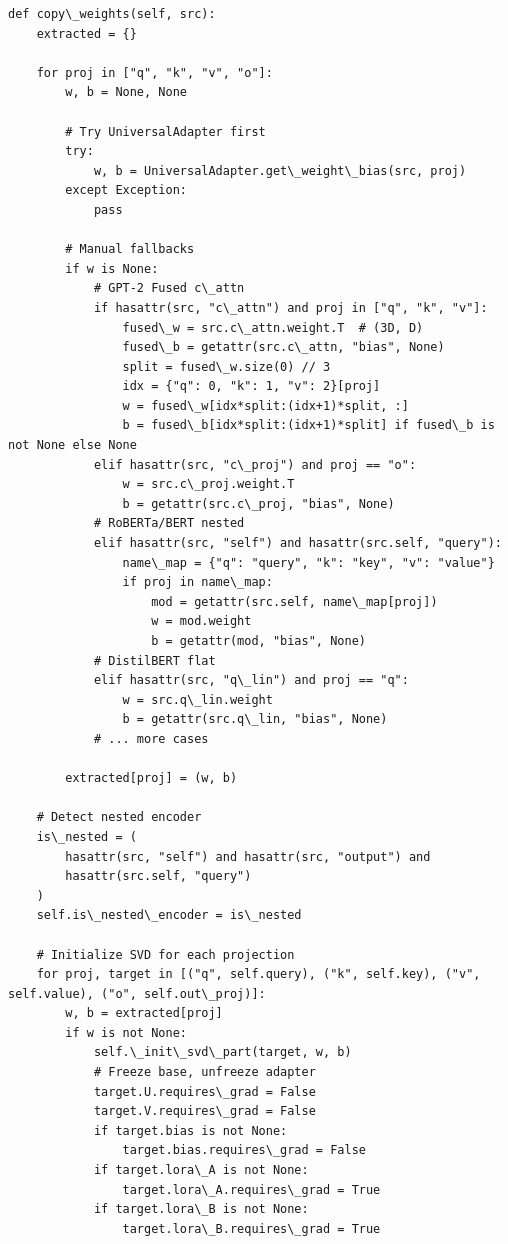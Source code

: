 \begin{lstlisting}
def copy\_weights(self, src):
    extracted = {}
    
    for proj in ["q", "k", "v", "o"]:
        w, b = None, None
        
        # Try UniversalAdapter first
        try:
            w, b = UniversalAdapter.get\_weight\_bias(src, proj)
        except Exception:
            pass
        
        # Manual fallbacks
        if w is None:
            # GPT-2 Fused c\_attn
            if hasattr(src, "c\_attn") and proj in ["q", "k", "v"]:
                fused\_w = src.c\_attn.weight.T  # (3D, D)
                fused\_b = getattr(src.c\_attn, "bias", None)
                split = fused\_w.size(0) // 3
                idx = {"q": 0, "k": 1, "v": 2}[proj]
                w = fused\_w[idx*split:(idx+1)*split, :]
                b = fused\_b[idx*split:(idx+1)*split] if fused\_b is not None else None
            elif hasattr(src, "c\_proj") and proj == "o":
                w = src.c\_proj.weight.T
                b = getattr(src.c\_proj, "bias", None)
            # RoBERTa/BERT nested
            elif hasattr(src, "self") and hasattr(src.self, "query"):
                name\_map = {"q": "query", "k": "key", "v": "value"}
                if proj in name\_map:
                    mod = getattr(src.self, name\_map[proj])
                    w = mod.weight
                    b = getattr(mod, "bias", None)
            # DistilBERT flat
            elif hasattr(src, "q\_lin") and proj == "q":
                w = src.q\_lin.weight
                b = getattr(src.q\_lin, "bias", None)
            # ... more cases
        
        extracted[proj] = (w, b)
    
    # Detect nested encoder
    is\_nested = (
        hasattr(src, "self") and hasattr(src, "output") and
        hasattr(src.self, "query")
    )
    self.is\_nested\_encoder = is\_nested
    
    # Initialize SVD for each projection
    for proj, target in [("q", self.query), ("k", self.key), ("v", self.value), ("o", self.out\_proj)]:
        w, b = extracted[proj]
        if w is not None:
            self.\_init\_svd\_part(target, w, b)
            # Freeze base, unfreeze adapter
            target.U.requires\_grad = False
            target.V.requires\_grad = False
            if target.bias is not None:
                target.bias.requires\_grad = False
            if target.lora\_A is not None:
                target.lora\_A.requires\_grad = True
            if target.lora\_B is not None:
                target.lora\_B.requires\_grad = True
\end{lstlisting}

